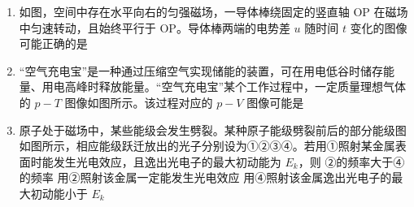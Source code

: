 \documentclass[\gkver]{gaokaozhenti}
\begin{document}
\begin{enumerate}
{	CD．乙沿 I 下滑，开始时乙速度为 0，到 N 点时乙竖直方向速度为零，根据瞬时功率公式 $P = mgv_{y}$ 可知重力瞬时功率先增大后减小，CD 错误。

	故选 B。
}

\item
如图，空间中存在水平向右的匀强磁场，一导体棒绕固定的竖直轴 OP 在磁场中匀速转动，且始终平行于 OP。导体棒两端的电势差 $u$ 随时间 $t$ 变化的图像可能正确的是


\onepicture[w=13.00cm]{}

\item
“空气充电宝”是一种通过压缩空气实现储能的装置，可在用电低谷时储存能量、用电高峰时释放能量。“空气充电宝”某个工作过程中，一定质量理想气体的 $p - T$ 图像如图所示。该过程对应的 $p - V$ 图像可能是


\onepicture[w=13.00cm]{}

\item
原子处于磁场中，某些能级会发生劈裂。某种原子能级劈裂前后的部分能级图如图所示，相应能级跃迁放出的光子分别设为①②③④。若用①照射某金属表面时能发生光电效应，且逸出光电子的最大初动能为 $E_{k}$，则
{②的频率大于④的频率}
{用②照射该金属一定能发生光电效应}
{用④照射该金属逸出光电子的最大初动能小于 $E_{k}$}
\end{enumerate}
\end{document}
